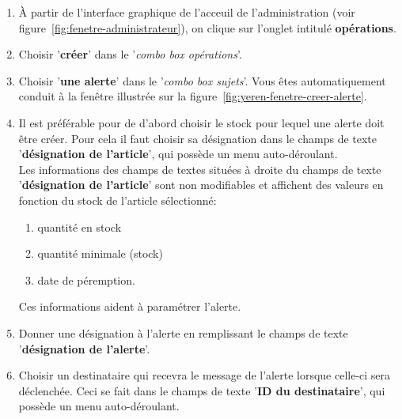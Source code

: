 
\newpage
{}\label{sec:alerte-periode-temps}

\begin{enumerate}[1)]
	\item \`A partir de l'interface graphique de l'acceuil de
		l'administration (voir figure~\ref{fig:fenetre-administrateur}),
		on clique sur l'onglet intitul\'e \textbf{op\'erations}. 
		
	\item Choisir '\textbf{cr\'eer}' dans le '\emph{combo box
		op\'erations}'.
		
	\item Choisir '\textbf{une alerte}' dans le '\emph{combo box
		sujets}'. Vous \^etes automatiquement conduit \`a la fen\^etre
		illustr\'ee sur la figure~\ref{fig:yeren-fenetre-creer-alerte}.	
		
	\item Il est pr\'ef\'erable pour de d'abord	choisir le stock
		pour lequel une alerte doit \^etre cr\'eer.	Pour cela il
		faut choisir sa d\'esignation dans le champs de texte
		'\textbf{d\'esignation de l'article}', qui poss\`ede un
		menu auto-d\'eroulant.\\

		Les informations des champs de textes situ\'ees \`a
		droite du champs de texte '\textbf{d\'esignation de l'article}'
		sont non modifiables et affichent des valeurs en fonction
		du stock de l'article s\'electionn\'e:
		\begin{enumerate} [1)]
			\item quantit\'e en stock
			\item quantit\'e minimale (stock)
			\item date de p\'eremption.		
		\end{enumerate}

		Ces informations aident \`a param\'etrer l'alerte.

	\item Donner une d\'esignation \`a l'alerte	en remplissant
		le champs de texte '\textbf{d\'esignation de l'alerte}'.
		
	\item Choisir un destinataire qui recevra le message de
		l'alerte lorsque celle-ci sera d\'eclench\'ee.
		Ceci se fait dans le champs de texte '\textbf{ID du destinataire}',
		qui poss\`ede un menu auto-d\'eroulant.\\
		

\end{enumerate}
